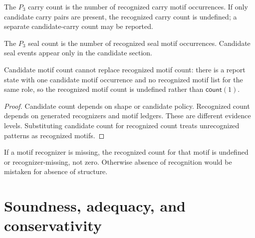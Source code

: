 \begin{definition}
\label{def:motif-report-carry-count}
The $P_3$ carry count is the number of recognized carry motif occurrences. If only candidate carry pairs are present, the recognized carry count is undefined; a separate candidate-carry count may be reported.
\end{definition}

\begin{definition}
\label{def:motif-report-seal-count}
The $P_3$ seal count is the number of recognized seal motif occurrences. Candidate seal events appear only in the candidate section.
\end{definition}

\begin{proposition}
\label{prop:motif-report-candidate-recognized-count-differ}
Candidate motif count cannot replace recognized motif count: there is a report state with one candidate motif occurrence and no recognized motif list for the same role, so the recognized motif count is undefined rather than $\mathsf{count}(1)$.
\end{proposition}

\begin{proof}
Candidate count depends on shape or candidate policy. Recognized count depends on generated recognizers and motif ledgers. These are different evidence levels. Substituting candidate count for recognized count treats unrecognized patterns as recognized motifs.
\end{proof}

\begin{corollary}
\label{cor:motif-report-missing-not-zero}
If a motif recognizer is missing, the recognized count for that motif is undefined or recognizer-missing, not zero. Otherwise absence of recognition would be mistaken for absence of structure.
\end{corollary}

\section{Soundness, adequacy, and conservativity}
\label{sec:motif-report-soundness-adequacy-conservativity}

